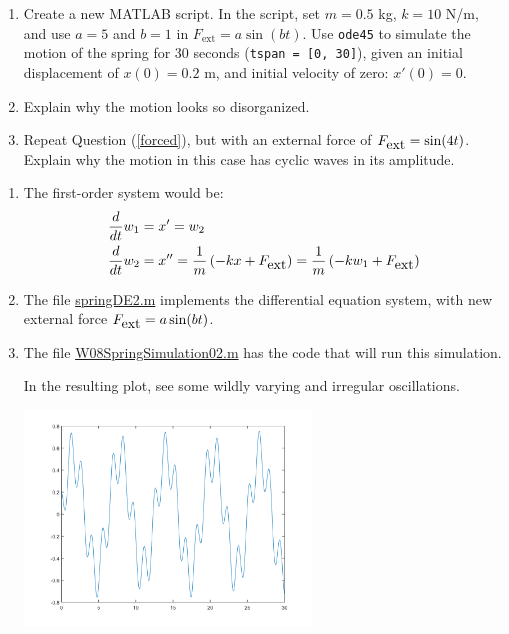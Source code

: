 \begin{enumerate}
\begin{Question}
\begin{enumerate}
\item Create a new MATLAB script.  In the script, set $m =0.5$ kg,
  $k = 10$ N/m, and use $a = 5$ and $b = 1$ in
  $F_{\mbox{ext}} = a \sin(bt)$.  Use \verb#ode45# to simulate the
  motion of the spring for 30 seconds (\verb#tspan = [0, 30]#), given
  an initial displacement of $x(0) = 0.2$ m, and initial velocity of
  zero: $x'(0) = 0$. \label{forced}

\item Explain why the motion looks so disorganized.

\item Repeat Question (\ref{forced}), but with an external force of
  $F_{\mbox{ext}} = \sin(4 t)$. Explain why the motion in this case has cyclic
  waves in its amplitude.


\end{enumerate}
  \end{Question}

\begin{Solution}
 \begin{enumerate}
 \item  The first-order system would be:
 \begin{align*}
 \frac{d}{dt} w_1 & = x' = w_2 \\
 \frac{d}{dt} w_2 & = x'' = \frac{1}{m} \left(-kx + F_{\mbox{ext}}\right) = \frac{1}{m} \left(-k w_1  + F_{\mbox{ext}} \right)
 \end{align*}

\item The file  
  \href{http://www.mast.queensu.ca/~apsc171/MNTCP01/PracticeProblems/MATLAB/springDE2.m}{springDE2.m} 
  implements the differential equation system, with new external force
  $F_{\mbox{ext}} = a \sin(bt)$.
\item The file 
\href{http://www.mast.queensu.ca/~apsc171/MNTCP01/PracticeProblems/MATLAB/W08SpringSimulation02.m}{W08SpringSimulation02.m} 
has the code that will run this simulation.

In the resulting plot, see some wildly varying and irregular
oscillations.

\begin{center}
\includegraphics[width=3in]{graphics/Week08_Spring/W08SpringSimulation02}
\end{center}


\end{enumerate}
\end{Solution}
\end{enumerate}

